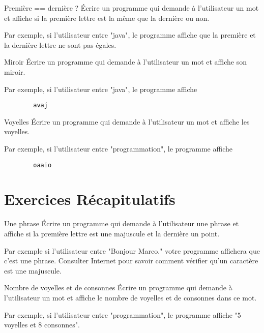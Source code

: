 \documentclass[a4paper,11pt]{article}
\begin{document}
	
	\begin{Exercice}{Première == dernière ?}	
		\'Ecrire un programme qui demande à l'utilisateur 
		un mot et affiche si la première lettre est la même que la dernière ou non.
		
		Par exemple, si l'utilisateur entre "java", le programme affiche que la première et 
		la dernière lettre ne sont pas égales.
	\end{Exercice}

	\begin{Exercice}{Miroir}	
		\'Ecrire un programme qui demande à l'utilisateur 
		un mot et affiche son miroir.
		
		Par exemple, si l'utilisateur entre "java", le programme affiche
		
		\begin{verbatim}
		avaj
		\end{verbatim}
	\end{Exercice}


	\begin{Exercice}{Voyelles}	
		\'Ecrire un programme qui demande à l'utilisateur 
		un mot et affiche les voyelles.
		
		Par exemple, si l'utilisateur entre "programmation", le programme affiche
		
		\begin{verbatim}
		oaaio
		\end{verbatim}
	\end{Exercice}

\section{Exercices Récapitulatifs}

	\begin{Exercice}{Une phrase}	
		\'Ecrire un programme qui demande à l'utilisateur 
		une phrase et affiche si la première lettre est une majuscule et la dernière un point.
		
		Par exemple si l'utilisateur entre "Bonjour Marco." votre programme affichera que c'est une phrase.
		Consulter Internet pour savoir comment vérifier qu'un caractère est une majuscule. 
		
	\end{Exercice}

	\begin{Exercice}{Nombre de voyelles et de consonnes}	
		\'Ecrire un programme qui demande à l'utilisateur 
		un mot et affiche le nombre de voyelles et de consonnes dans ce mot.
		
		Par exemple, si l'utilisateur entre "programmation", le programme affiche "5 voyelles et 8 consonnes".	
	\end{Exercice}
\end{document}
